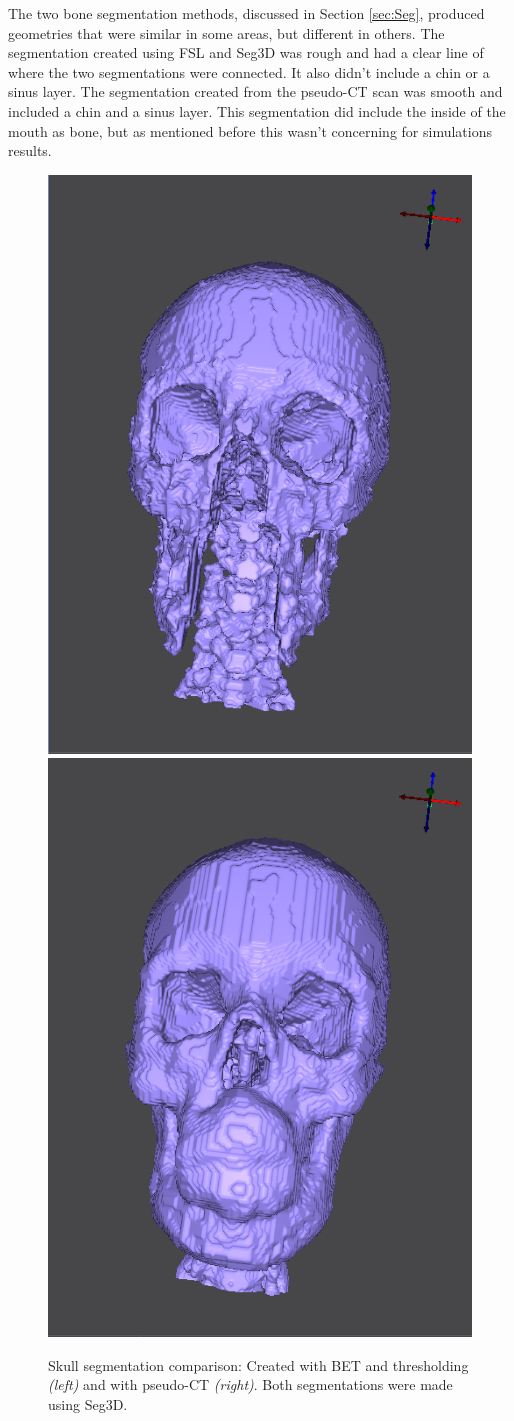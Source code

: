 The two bone segmentation methods, discussed in Section \ref{sec:Seg}, produced geometries that were similar in some areas, but different in others. The segmentation created using FSL and Seg3D was rough and had a clear line of where the two segmentations were connected. It also didn't include a chin or a sinus layer. The segmentation created from the pseudo-CT scan was smooth and included a chin and a sinus layer. This segmentation did include the inside of the mouth as bone, but as mentioned before this wasn't concerning for simulations results.

\begin{figure}[H]
\begin{center}
\includegraphics[width=.49\textwidth]{Figures/skull_before}
\includegraphics[width=.49\textwidth]{Figures/skull_after}
\caption{Skull segmentation comparison: Created with BET and thresholding \textit{(left)} and with pseudo-CT \textit{(right)}. Both segmentations were made using Seg3D.}
\label{fig:skull}
\end{center}
\end{figure}

